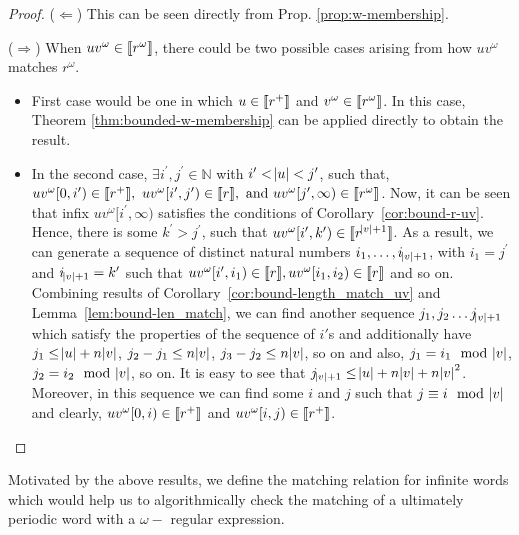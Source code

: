 \begin{proof}
($\Leftarrow$) This can be seen directly from Prop. \ref{prop:w-membership}.

($\Rightarrow$) When $uv^\omega\in {\llbracket}r^\omega{\rrbracket}$, there could be two possible cases arising from how $uv^\omega$ matches $r^\omega$.  
\begin{itemize}[label=$-$]
    \item First case would be one in which $u\in{\llbracket}r^+{\rrbracket}$ and $v^\omega\in {\llbracket}r^\omega{\rrbracket}$. In this case, Theorem \ref{thm:bounded-w-membership} can be applied directly to obtain the result. 
    \item In the second case, $\exists i^\prime, j^\prime \in \mathbb{N}$ with $i^\prime<\abs{u}<j^\prime$, such that, $uv^\omega[0,i^\prime)\in\sema{r^+},\ uv^\omega[i^\prime,j^\prime)\in\sema{r}, \text{ and } uv^\omega[j^\prime,\infty)\in \sema{r^\omega}$. Now, it can be seen that infix $uv^\omega[i^\prime,\infty)$ satisfies the conditions of Corollary~\ref{cor:bound-r-uv}. Hence, there is some $k^\prime>j^\prime$, such that $uv^\omega[i^\prime,k^\prime)\in {\llbracket}r^{\abs{v}+1}{\rrbracket}$. As a result, we can generate a sequence of distinct natural numbers $i_1,\ldots, i_{\abs{v}+1}$, with $i_1=j^\prime$ and $i_{\abs{v}+1}=k^\prime$ such that $uv^\omega[i^\prime,i_1)\in{\llbracket}r{\rrbracket},uv^\omega[i_1,i_2)\in{\llbracket}r{\rrbracket}$ and so on. Combining results of  Corollary~\ref{cor:bound-length_match_uv} and Lemma~\ref{lem:bound-len_match}, we can find another sequence $j_1,j_2\ldots j_{\abs{v}+1}$ which satisfy the properties of the sequence of $i'$s and additionally have $j_1\leq\abs{u}+n\abs{v}$, $j_2-j_1\leq n\abs{v}$, $j_3-j_2\leq n\abs{v}$, so on and also, $j_1=i_1\mod{\abs{v}}$, $j_2=i_2\mod{\abs{v}}$, so on. It is easy to see that $j_{\abs{v}+1}\leq \abs{u}+n\abs{v}+n\abs{v}^2$. Moreover, in this sequence  we can find some $i$ and $j$ such that $j \equiv i \mod{\abs{v}}$ and clearly, $uv^\omega[0,i)\in{\llbracket}r^+{\rrbracket}$ and $uv^\omega[i,j)\in{\llbracket}r^+{\rrbracket}$.
\end{itemize}

\end{proof}

Motivated by the above results, we define the matching relation for infinite words which would help us to algorithmically check the matching of a ultimately periodic word with a $\omega-$ regular expression.


